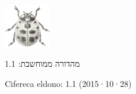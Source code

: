 \begin{titlepage}
\begin{center}
	\includegraphics[width=2.0cm]{"puŝiŝit.png"}
\end{center}

\apartigilo

\dulingvaujo
{
	\begin{center}
		מהדורה ממוחשבת: 1.1 
	\end{center}
}
{
	\begin{center}
		Cifereca eldono: 1.1 (2015·10·28)
	\end{center}
}

\end{titlepage}
